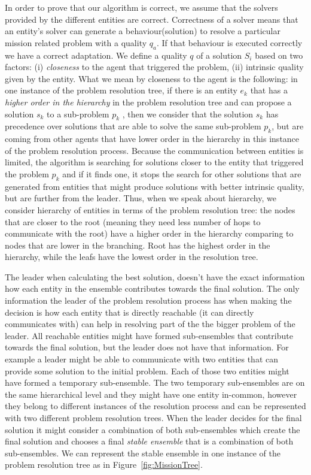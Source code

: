 \documentclass[journal]{IEEEtran}
\theoremstyle{definition}
\begin{document}
In order to prove that our algorithm is correct, we assume that the solvers provided by the different entities are correct. 
Correctness of a solver means that an entity's solver can generate a behaviour(solution) to resolve a particular mission related problem with a quality $q_a$. If that behaviour is executed correctly we have a correct adaptation.
We define a quality $q$ of a solution  $S_i$  based on two factors: (i) \textit{closeness} to the agent that triggered the problem, (ii) intrinsic quality given by the entity.
What we mean by closeness to the agent is the following: in one instance of the problem resolution tree, if there is an entity $e_k$ that has a \textit{higher order in the hierarchy} in the problem resolution tree 
and can propose a solution $s_k$ to a sub-problem $p_k$ , then we consider that the solution $s_k$ has precedence over solutions that are able to solve the same sub-problem $p_k$, but are coming from other agents that have lower order in the hierarchy in this instance of the problem resolution process.  
Because the communication between entities is limited, the algorithm is searching for solutions closer to the entity that triggered the problem $p_k$ and if it finds one, it stops the search for other solutions that are generated from entities that might produce solutions with better intrinsic quality, but are further from the leader. Thus, when we speak about hierarchy, we consider hierarchy of entities in terms of the problem resolution tree: the nodes that are closer to the root (meaning they need less number of hops to communicate with the root) have a higher order in the hierarchy comparing to nodes that are lower in the branching. Root has the highest order in the hierarchy, while the leafs have the lowest order in the resolution tree.

The leader when calculating the best solution, doesn't have the exact information how each entity in the ensemble contributes towards the final solution. The only information the leader of the problem resolution process has when making the decision is how each entity that is directly reachable (it can directly communicates with) can help in resolving part of the the bigger problem of the leader. All reachable entities might have formed sub-ensembles that contribute towards the final solution, but the leader does not have that information.
For example a leader might be able to communicate with two entities that can provide some solution to the initial problem. Each of those two entities might have formed a temporary sub-ensemble. 
The two temporary sub-ensembles are on the same hierarchical level and they might have one entity in-common, however they belong to different instances of the resolution process and can be represented with two different problem resolution trees. When the leader decides for the final solution it might consider a combination of both sub-ensembles which create the final solution and chooses a final \textit{stable ensemble} that is a combination of both sub-ensembles. We can represent the stable ensemble in one instance of the problem resolution tree as in Figure~\ref{fig:MissionTree}.
\end{document}
